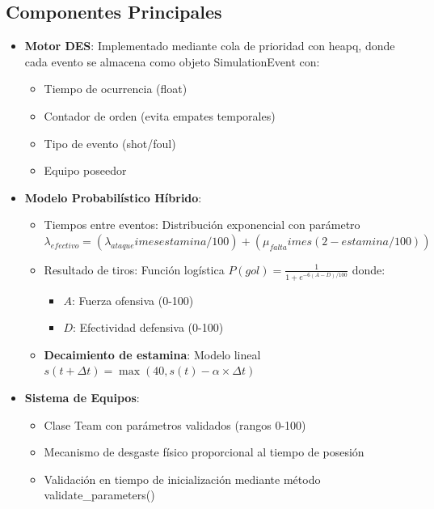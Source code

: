 \documentclass{article}
\begin{document}
\subsection{Componentes Principales}
\begin{itemize}
    \item \textbf{Motor DES}: Implementado mediante cola de prioridad con heapq, donde cada evento se almacena como objeto SimulationEvent con:
    \begin{itemize}
        \item Tiempo de ocurrencia (float)
        \item Contador de orden (evita empates temporales)
        \item Tipo de evento (shot/foul)
        \item Equipo poseedor
    \end{itemize}
    
    \item \textbf{Modelo Probabilístico Híbrido}:
    \begin{itemize}
        \item Tiempos entre eventos: Distribución exponencial con parámetro $\lambda_{efectivo} = (\lambda_{ataque} 	imes estamina/100) + (\mu_{falta} 	imes (2 - estamina/100))$
        \item Resultado de tiros: Función logística $P(gol) = \frac{1}{1 + e^{-6(A-D)/100}}$ donde:
        \begin{itemize}
            \item $A$: Fuerza ofensiva (0-100)
            \item $D$: Efectividad defensiva (0-100)
        \end{itemize}
        \item \textbf{Decaimiento de estamina}: Modelo lineal $s(t+\Delta t) = \max(40, s(t) - \alpha \times \Delta t)$
    \end{itemize}
    
    \item \textbf{Sistema de Equipos}:
    \begin{itemize}
        \item Clase Team con parámetros validados (rangos 0-100)
        \item Mecanismo de desgaste físico proporcional al tiempo de posesión
        \item Validación en tiempo de inicialización mediante método validate\_parameters()
    \end{itemize}
\end{itemize}
\end{document}
